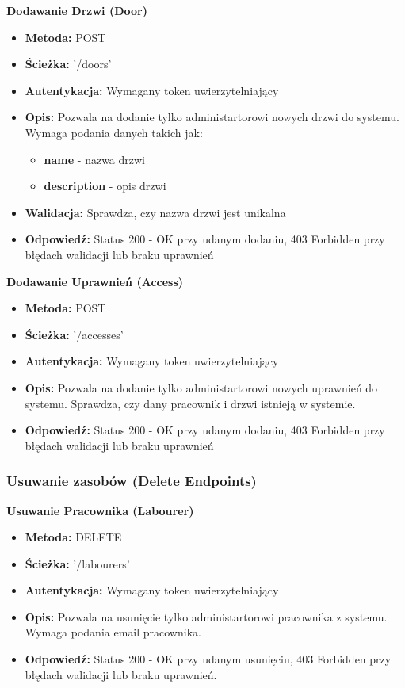 \textbf{\large{Dodawanie Drzwi (Door)}}
\begin{itemize}
    \item \textbf{Metoda:} POST
    \item \textbf{Ścieżka:} '/doors'
    \item \textbf{Autentykacja:} Wymagany token uwierzytelniający
    \item \textbf{Opis:} Pozwala na dodanie tylko administartorowi nowych drzwi do systemu. Wymaga podania danych takich jak:
        \begin{itemize}
        \item \textbf{name} - nazwa drzwi
        \item \textbf{description} - opis drzwi
        \end{itemize}
    \item \textbf{Walidacja:} Sprawdza, czy nazwa drzwi jest unikalna
    \item \textbf{Odpowiedź:} Status 200 - OK przy udanym dodaniu, 403 Forbidden przy błędach walidacji lub braku uprawnień
\end{itemize}

\textbf{\large{Dodawanie Uprawnień (Access)}}
\begin{itemize}
    \item \textbf{Metoda:} POST
    \item \textbf{Ścieżka:} '/accesses'
    \item \textbf{Autentykacja:} Wymagany token uwierzytelniający
    \item \textbf{Opis:} Pozwala na dodanie tylko administartorowi nowych uprawnień do systemu. Sprawdza, czy dany pracownik i drzwi istnieją w systemie.
    \item \textbf{Odpowiedź:} Status 200 - OK przy udanym dodaniu, 403 Forbidden przy błędach walidacji lub braku uprawnień
\end{itemize}

\subsubsection{\textbf{\large{Usuwanie zasobów (Delete Endpoints)}}}
\textbf{\large{Usuwanie Pracownika (Labourer)}}
\begin{itemize}
    \item \textbf{Metoda:} DELETE
    \item \textbf{Ścieżka:} '/labourers'
    \item \textbf{Autentykacja:} Wymagany token uwierzytelniający
    \item \textbf{Opis:} Pozwala na usunięcie tylko administartorowi pracownika z systemu. Wymaga podania email pracownika.
    \item \textbf{Odpowiedź:} Status 200 - OK przy udanym usunięciu, 403 Forbidden przy błędach walidacji lub braku uprawnień.
\end{itemize}

